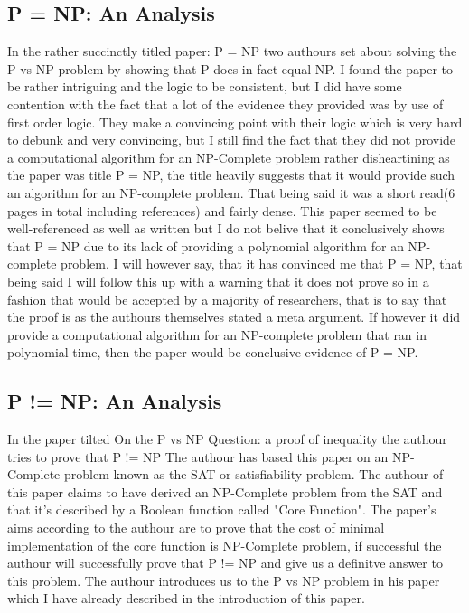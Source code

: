 \documentclass{report}
\begin{document}
\subsection{P = NP: An Analysis}
In the rather succinctly titled paper: P = NP\cite{PVsNPSolved} two authours set about solving the P vs NP problem by showing that P does in fact equal NP.  I found the paper to be rather intriguing and the logic to be consistent, but I did have some contention with the fact that a lot of the evidence they provided was by use of first order logic.  They make a convincing point with their logic which is very hard to debunk and very convincing, but I still find the fact that they did not provide a computational algorithm for an NP-Complete problem rather disheartining as the paper was title P = NP, the title heavily suggests that it would provide such an algorithm for an NP-complete problem.  That being said it was a short read(6 pages in total including references) and fairly dense.  This paper seemed to be well-referenced as well as written but I do not belive that it conclusively shows that P = NP due to its lack of providing a polynomial algorithm for an NP-complete problem.  I will however say, that it has convinced me that P = NP, that being said I will follow this up with a warning that it does not prove so in a fashion that would be accepted by a majority of researchers, that is to say that the proof is as the authours themselves stated a meta argument.  If however it did provide a computational algorithm for an NP-complete problem that ran in polynomial time, then the paper would be conclusive evidence of P = NP.
\subsection{P != NP: An Analysis}
In the paper tilted On the P vs NP Question: a proof of inequality the authour tries to prove that P != NP\cite{P!=NP} The authour has based this paper on an NP-Complete problem known as the SAT or satisfiability problem\cite{satisfiability}. The authour of this paper claims to have derived an NP-Complete problem from the SAT and that it's described by a Boolean function called "Core Function".  The paper's aims according to the authour are to prove that the cost of minimal implementation of the core function is NP-Complete problem, if successful the authour will successfully prove that P != NP and give us a definitve answer to this problem.  The authour introduces us to the P vs NP problem in his paper which I have already described in the introduction of this paper.
\end{document}
